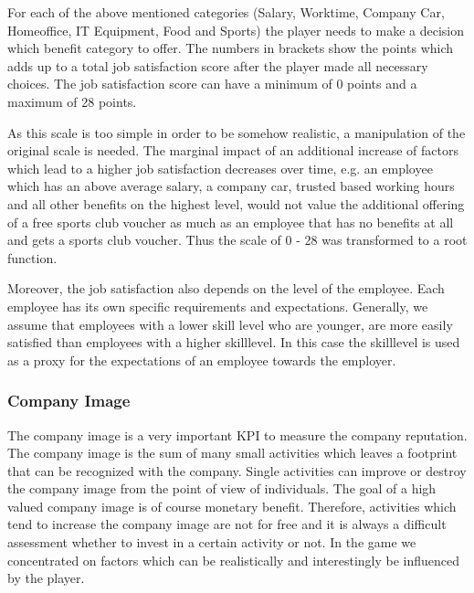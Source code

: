 For each of the above mentioned categories (Salary, Worktime, Company Car, Homeoffice, IT Equipment, Food and Sports) the player needs to make a decision which benefit category to offer. The numbers in brackets show the points which adds up to a total job satisfaction score after the player made all necessary choices. The job satisfaction score can have a minimum of 0 points and a maximum of 28 points.

As this scale is too simple in order to be somehow realistic, a manipulation of the original scale is needed. The marginal impact of an additional increase of factors which lead to a higher job satisfaction decreases over time, e.g. an employee which has an above average salary, a company car, trusted based working hours and all other benefits on the highest level, would not value the additional offering of a free sports club voucher as much as an employee that has no benefits at all and gets a sports club voucher. Thus the scale of 0 - 28 was transformed to a root function.

Moreover, the job satisfaction also depends on the level of the employee. Each employee has its own specific requirements and expectations. Generally, we assume that employees with a lower skill level who are younger, are more easily satisfied than employees with a higher skilllevel. In this case the skilllevel  is used as a proxy for the expectations of an employee towards the employer. 


\subsubsection{Company Image}
The company image is a very important KPI to measure the company reputation. The company image is the sum of many small activities which leaves a footprint that can be recognized with the company. Single activities can improve or destroy the company image from the point of view of individuals. The goal of a high valued company image is of course monetary benefit. Therefore, activities which tend to increase the company image are not for free and it is always a difficult assessment whether to invest in a certain activity or not. In the game we concentrated on factors which can be realistically and interestingly be influenced by the player.


